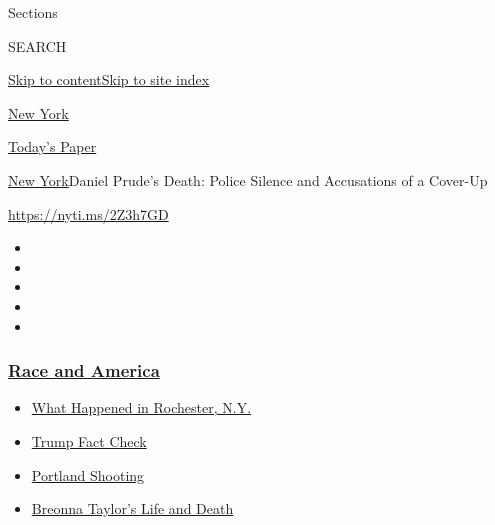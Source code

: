 Sections

SEARCH

\protect\hyperlink{site-content}{Skip to
content}\protect\hyperlink{site-index}{Skip to site index}

\href{https://www.nytimes3xbfgragh.onion/section/nyregion}{New York}

\href{https://myaccount.nytimes3xbfgragh.onion/auth/login?response_type=cookie\&client_id=vi}{}

\href{https://www.nytimes3xbfgragh.onion/section/todayspaper}{Today's
Paper}

\href{/section/nyregion}{New York}\textbar{}Daniel Prude's Death: Police
Silence and Accusations of a Cover-Up

\url{https://nyti.ms/2Z3h7GD}

\begin{itemize}
\item
\item
\item
\item
\item
\end{itemize}

\hypertarget{race-and-america}{%
\subsubsection{\texorpdfstring{\href{https://www.nytimes3xbfgragh.onion/news-event/george-floyd-protests-minneapolis-new-york-los-angeles?name=styln-george-floyd\&region=TOP_BANNER\&block=storyline_menu_recirc\&action=click\&pgtype=Article\&impression_id=e8adb670-f277-11ea-882a-edf7a22bd498\&variant=undefined}{Race
and America}}{Race and America}}\label{race-and-america}}

\begin{itemize}
\tightlist
\item
  \href{https://www.nytimes3xbfgragh.onion/2020/09/04/nyregion/rochester-police-daniel-prude.html?name=styln-george-floyd\&region=TOP_BANNER\&block=storyline_menu_recirc\&action=click\&pgtype=Article\&impression_id=e8adb671-f277-11ea-882a-edf7a22bd498\&variant=undefined}{What
  Happened in Rochester, N.Y.}
\item
  \href{https://www.nytimes3xbfgragh.onion/2020/09/01/us/politics/trump-fact-check-protests.html?name=styln-george-floyd\&region=TOP_BANNER\&block=storyline_menu_recirc\&action=click\&pgtype=Article\&impression_id=e8adb672-f277-11ea-882a-edf7a22bd498\&variant=undefined}{Trump
  Fact Check}
\item
  \href{https://www.nytimes3xbfgragh.onion/2020/08/30/us/portland-shooting-explained.html?name=styln-george-floyd\&region=TOP_BANNER\&block=storyline_menu_recirc\&action=click\&pgtype=Article\&impression_id=e8adb673-f277-11ea-882a-edf7a22bd498\&variant=undefined}{Portland
  Shooting}
\item
  \href{https://www.nytimes3xbfgragh.onion/2020/08/30/us/breonna-taylor-police-killing.html?name=styln-george-floyd\&region=TOP_BANNER\&block=storyline_menu_recirc\&action=click\&pgtype=Article\&impression_id=e8addd80-f277-11ea-882a-edf7a22bd498\&variant=undefined}{Breonna
  Taylor's Life and Death}
\end{itemize}

